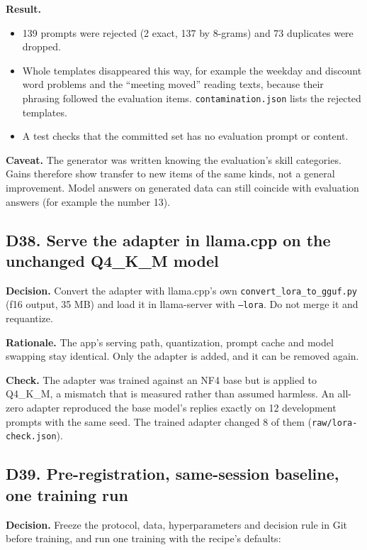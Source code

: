 \documentclass[11pt,a4paper]{article}
\newcommand{\code}[1]{\texttt{#1}}
\begin{document}
\textbf{Result.}

\begin{itemize}
\item 139 prompts were rejected (2 exact, 137 by 8-grams) and 73 duplicates were dropped.
\item Whole templates disappeared this way, for example the weekday and discount word problems and the ``meeting moved'' reading texts, because their phrasing followed the evaluation items. \code{contamination.json} lists the rejected templates.
\item A test checks that the committed set has no evaluation prompt or content.
\end{itemize}

\textbf{Caveat.} The generator was written knowing the evaluation's skill categories. Gains therefore show transfer to new items of the same kinds, not a general improvement. Model answers on generated data can still coincide with evaluation answers (for example the number 13).

\subsection{D38. Serve the adapter in llama.cpp on the unchanged Q4\_K\_M model}

\textbf{Decision.} Convert the adapter with llama.cpp's own \code{convert\_lora\_to\_gguf.py} (f16 output, 35 MB) and load it in llama-server with \code{--lora}. Do not merge it and requantize.

\textbf{Rationale.} The app's serving path, quantization, prompt cache and model swapping stay identical. Only the adapter is added, and it can be removed again.

\textbf{Check.} The adapter was trained against an NF4 base but is applied to Q4\_K\_M, a mismatch that is measured rather than assumed harmless. An all-zero adapter reproduced the base model's replies exactly on 12 development prompts with the same seed. The trained adapter changed 8 of them (\code{raw/lora-check.json}).

\subsection{D39. Pre-registration, same-session baseline, one training run}

\textbf{Decision.} Freeze the protocol, data, hyperparameters and decision rule in Git before training, and run one training with the recipe's defaults:
\end{document}
